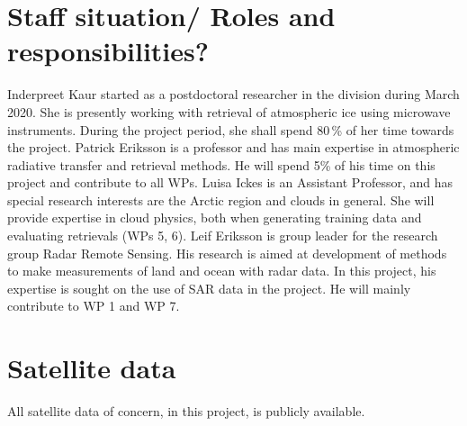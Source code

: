 \documentclass[12pt,oneside,a4paper]{article}
\begin{document}
\section{Staff situation/ Roles and responsibilities?}
\label{sec:staff}
%
Inderpreet Kaur started as a postdoctoral researcher in the division during March 2020.  She is presently working with retrieval of atmospheric ice using microwave instruments. During the project period, she shall spend 80\,\% of her time towards the project. Patrick Eriksson is a professor and has main expertise in atmospheric radiative transfer and retrieval methods. He will spend 5\% of his time on this project and contribute to all WPs. Luisa Ickes is an Assistant Professor, and has special research interests are the Arctic region and clouds in general. She will provide expertise in cloud physics, both when generating training data and evaluating retrievals (WPs 5, 6). Leif Eriksson is group leader for the research group Radar Remote Sensing. His research is aimed at development of methods to make measurements of land and ocean with radar data. In this project, his expertise is sought on the use of SAR data in the project. He will mainly contribute to WP 1 and WP 7. 

\section{Satellite data}
%
All satellite data of concern, in this project, is publicly available. 

{\footnotesize
	
}
\end{document}
